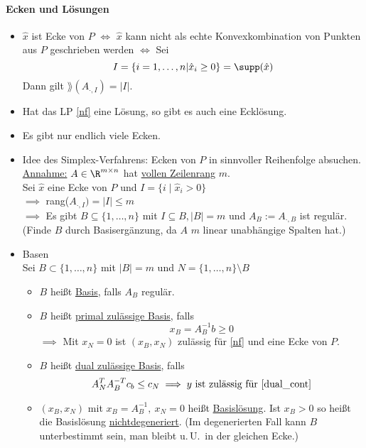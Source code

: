 \paragraph{Ecken und Lösungen}
\begin{itemize}
  \item $\hat{x}$ ist Ecke von $P$ $\iff$ $ \hat{x}$ kann nicht als echte Konvexkombination von Punkten aus $P$ geschrieben werden
		$\iff$ Sei
		\begin{equation*}
			I = \{i = 1 ,\dots, n | \hat{x}_{i} \geq 0 \} = \supp(\hat{x})
		\end{equation*}
		Dann gilt $\rang(A_{\cdot,I})=|I|$.
	\item Hat das LP \eqref{nf} eine Lösung, so gibt es auch eine Ecklösung.
	\item Es gibt nur endlich viele Ecken.
	\item Idee des Simplex-Verfahrens: Ecken von $P$ in sinnvoller Reihenfolge absuchen.\\
		\underline{Annahme:} $A \in \R^{m \times n }$ hat \underline{vollen Zeilenrang} $m$. \\
		Sei $\hat{x}$ eine Ecke von $P$ und $I = \{i \mid \hat{x}_{i}>0\}$ \\
		$\implies$ rang($A_{\cdot,I}   )= |I| \leq m$ \\
    $\implies$ Es gibt $B \subseteq \{1,\dots,n\}$ mit $I \subseteq B, |B| = m $ und $A_{B}:= A_{\cdot,B}$ ist regulär. (Finde $B$ durch Basisergänzung, da $A$ $m$ linear unabhängige Spalten hat.)
	\item Basen\\
		Sei $B \subset \{1,\dots,n\}$ mit $|B|=m$ und $N = \{1,\dots,n\}\setminus B$
    \begin{itemize}[label=$\to$] %
      \item $B$ heißt \underline{Basis}, falls $A_{B}$ regulär.
      \item $B$ heißt \underline{primal zulässige Basis}, falls
        \begin{equation*}
          x_{B}=A_{B}^{-1}b \geq 0
        \end{equation*} $\implies$ Mit $x_{N} = 0$ ist $(x_{B},x_{N})$ zulässig für \eqref{nf} und eine Ecke von $P$.
      \item $B$ heißt \underline{dual zulässige Basis}, falls
        \begin{equation*}
          A_{N}^TA_{B}^{-T}c_{b} \leq c_{N} \implies y \text{ ist zulässig für \eqref{dual_cont}}
        \end{equation*}
      \item $\left(x_{B},x_{N} \right)$ mit $x_{B} = A^{-1}_{B},\ x_{N}= 0$ heißt \underline{Basislösung}. Ist $x_{B} > 0 $ so heißt die Basislösung \underline{nichtdegeneriert}.
        (Im degenerierten Fall kann $B$ unterbestimmt sein, man bleibt u.\,U.\ in der gleichen Ecke.)
    \end{itemize}
\end{itemize}
%
